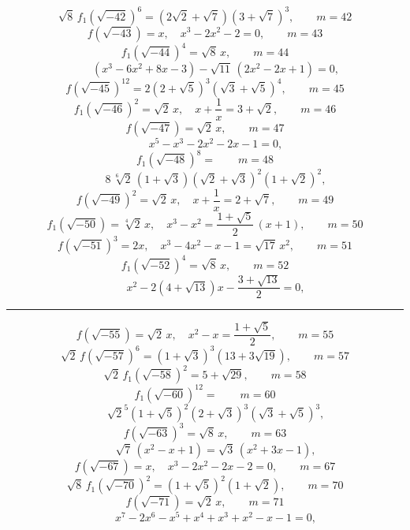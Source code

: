 
\[ \sqrt8\,f_1(\sqrt{-42})^6 = (2\sqrt2+\sqrt7)(3+\sqrt7)^3, \qquad m = 42 \]
\[ f(\sqrt{-43}) = x, \quad x^3 - 2x^2 - 2 = 0, \qquad m = 43 \]
\[ f_1(\sqrt{-44})^4 = \sqrt8\,x, \qquad m = 44 \]
\[ \qquad (x^3 - 6x^2 + 8x - 3) - \sqrt{11}\,(2x^2-2x+1) = 0, \]
\[ f(\sqrt{-45})^{12} = 2(2+\sqrt5)^3(\sqrt3+\sqrt5)^4, \qquad m = 45 \]
\[ f_1(\sqrt{-46})^2 = \sqrt2\,x, \quad x + \frac{1}{x} = 3 + \sqrt2, \qquad m = 46 \]
\[ f(\sqrt{-47}) = \sqrt2\,x, \qquad m = 47 \]
\[ \qquad x^5 - x^3 - 2x^2 - 2x - 1 = 0, \]
\[ f_1(\sqrt{-48})^8 = \qquad m = 48 \]
\[ \qquad 8\,\sqrt[6]{2}\,(1+\sqrt3)(\sqrt2+\sqrt3)^2(1+\sqrt2)^2, \]
\[ f(\sqrt{-49})^2 = \sqrt2\,x, \quad x + \frac{1}{x} = 2 + \sqrt7, \qquad m = 49 \]
\[ f_1(\sqrt{-50}) = \sqrt[4]{2}\,x, \quad x^3 - x^2 = \frac{1+\sqrt5}{2}\,(x+1), \qquad m = 50 \]
\[ f(\sqrt{-51})^3 = 2x, \quad x^3 - 4x^2 - x - 1 = \sqrt{17}\,x^2, \qquad m = 51 \]
\[ f_1(\sqrt{-52})^4 = \sqrt8\,x, \qquad m = 52 \]
\[ \qquad x^2 - 2(4+\sqrt{13})x - \frac{3+\sqrt{13}}{2} = 0, \]

\begin{center}
\rule{4cm}{0.4pt}
\end{center}

\[ f(\sqrt{-55}) = \sqrt2\,x, \quad x^2 - x = \frac{1+\sqrt5}{2}, \qquad m = 55 \]
\[ \sqrt2\,f(\sqrt{-57})^6 = (1+\sqrt3)^3(13+3\sqrt{19}), \qquad m = 57 \]
\[ \sqrt2\,f_1(\sqrt{-58})^2 = 5 + \sqrt{29}, \qquad m = 58 \]
\[ f_1(\sqrt{-60})^{12} = \qquad m = 60 \]
\[ \qquad \sqrt2^5(1+\sqrt5)^2(2+\sqrt3)^3(\sqrt3+\sqrt5)^3, \]
\[ f(\sqrt{-63})^3 = \sqrt8\,x, \qquad m = 63 \]
\[ \qquad \sqrt7\,(x^2-x+1) = \sqrt3\,(x^2+3x-1), \]
\[ f(\sqrt{-67}) = x, \quad x^3 - 2x^2 - 2x - 2 = 0, \qquad m = 67 \]
\[ \sqrt8\,f_1(\sqrt{-70})^2 = (1+\sqrt5)^2(1+\sqrt2), \qquad m = 70 \]
\[ f(\sqrt{-71}) = \sqrt2\,x, \qquad m = 71 \]
\[ \qquad x^7 - 2x^6 - x^5 + x^4 + x^3 + x^2 - x - 1 = 0, \]
